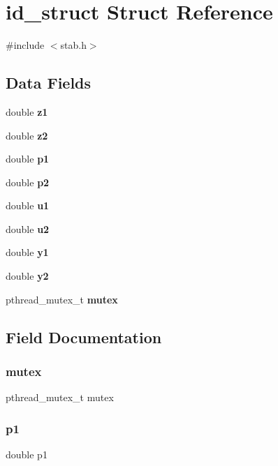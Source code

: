 \section{id\+\_\+struct Struct Reference}
\label{structid__struct}


{\ttfamily \#include $<$stab.\+h$>$}

\subsection*{Data Fields}
\begin{DoxyCompactItemize}
\item 
double \textbf{ z1}
\item 
double \textbf{ z2}
\item 
double \textbf{ p1}
\item 
double \textbf{ p2}
\item 
double \textbf{ u1}
\item 
double \textbf{ u2}
\item 
double \textbf{ y1}
\item 
double \textbf{ y2}
\item 
pthread\+\_\+mutex\+\_\+t \textbf{ mutex}
\end{DoxyCompactItemize}


\subsection{Field Documentation}
\mbox{\label{structid__struct_a4acff8232e4aec9cd5c6dc200ac55ef3}} 
\subsubsection{mutex}
{\footnotesize\ttfamily pthread\+\_\+mutex\+\_\+t mutex}

\mbox{\label{structid__struct_afe3ec2bbc515ef1c2c03dccf567831f4}} 
\subsubsection{p1}
{\footnotesize\ttfamily double p1}

\mbox{\label{structid__struct_afb3d783e05c27da8ea3c53c9d2e17af1}} 
